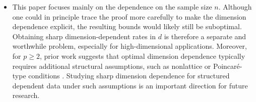 \documentclass[mnsc,nonblindrev]{informs3}
\begin{document}
\begin{itemize}
Kolmogorov distance, and under additional assumptions such as strong
aperiodicity. It would be interesting to use the more general split-chain
theory developed in this paper to obtain analogous multivariate results.
\item This paper focuses mainly on the dependence on the sample size \(n\). Although
one could in principle trace the proof more carefully to make the dimension
dependence explicit, the resulting bounds would likely still be suboptimal.
Obtaining sharp dimension-dependent rates in \(d\) is therefore a separate and
worthwhile problem, especially for high-dimensional applications. Moreover, for
\(p\ge 2\), prior work suggests that optimal dimension dependence typically
requires additional structural assumptions, such as nonlattice or
Poincar\'e-type conditions \citep{bonis2020stein,bonis2024improved}. Studying
sharp dimension dependence for structured dependent data under such assumptions
is an important direction for future research.
\end{itemize}
%
%
%





\end{document}
